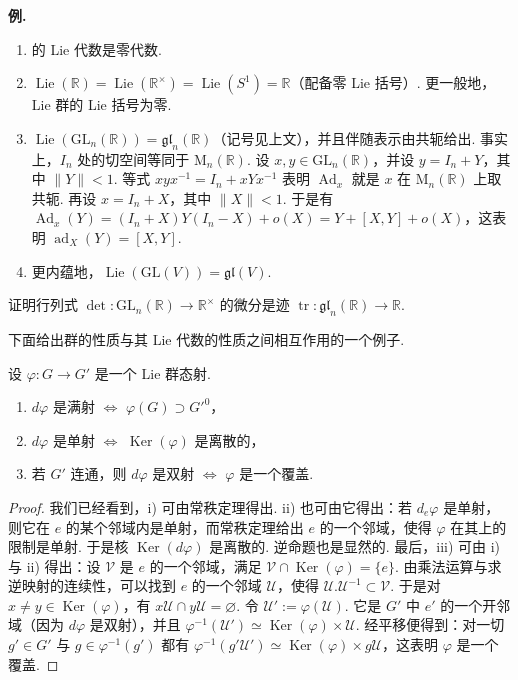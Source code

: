 \noindent\textbf{例.}
\begin{enumerate}[label=\roman*)]
\item {}的 Lie 代数是零代数.
\item $\operatorname{Lie}(\mathbb{R})=\operatorname{Lie}(\mathbb{R}^{\times})=\operatorname{Lie}(S^1)=\mathbb{R}$（配备零 Lie 括号）. 更一般地， Lie 群的 Lie 括号为零.
\item $\operatorname{Lie}(\mathrm{GL}_n(\mathbb{R}))=\mathfrak{gl}_n(\mathbb{R})$（记号见上文），并且伴随表示由共轭给出. 事实上，$I_n$ 处的切空间等同于 $\mathrm{M}_n(\mathbb{R})$. 设 $x,y\in\mathrm{GL}_n(\mathbb{R})$，并设 $y=I_n+Y$，其中 $\|Y\|<1$. 等式 $xyx^{-1}=I_n+xYx^{-1}$ 表明 $\operatorname{Ad}_x$ 就是 $x$ 在 $\mathrm{M}_n(\mathbb{R})$ 上取共轭. 再设 $x=I_n+X$，其中 $\|X\|<1$. 于是有 $\operatorname{Ad}_x(Y)=(I_n+X)Y(I_n-X)+o(X)=Y+[X,Y]+o(X)$，这表明 $\operatorname{ad}_X(Y)=[X,Y]$.
\item 更内蕴地，$\operatorname{Lie}(\mathrm{GL}(V))=\mathfrak{gl}(V)$.
\end{enumerate}

\begin{exercise*}
证明行列式 $\det:\mathrm{GL}_n(\mathbb{R})\longrightarrow\mathbb{R}^{\times}$ 的微分是迹 $\operatorname{tr}:\mathfrak{gl}_n(\mathbb{R})\longrightarrow\mathbb{R}$.
\end{exercise*}

下面给出群的性质与其 Lie 代数的性质之间相互作用的一个例子.

\begin{proposition}\label{prop:lie-1-5-8}
设 $\varphi:G\longrightarrow G'$ 是一个 Lie 群态射.
\begin{enumerate}[label=\roman*)]
\item $d\varphi$ 是满射 $\Leftrightarrow$ $\varphi(G)\supset G'^{0}$，
\item $d\varphi$ 是单射 $\Leftrightarrow$ $\operatorname{Ker}(\varphi)$ 是离散的，
\item 若 $G'$ 连通，则 $d\varphi$ 是双射 $\Leftrightarrow$ $\varphi$ 是一个覆盖.
\end{enumerate}
\end{proposition}

\begin{proof}
我们已经看到，i) 可由常秩定理得出. ii) 也可由它得出：若 $d_{e}\varphi$ 是单射，则它在 $e$ 的某个邻域内是单射，而常秩定理给出 $e$ 的一个邻域，使得 $\varphi$ 在其上的限制是单射. 于是核 $\operatorname{Ker}(d\varphi)$ 是离散的. 逆命题也是显然的. 最后，iii) 可由 i) 与 ii) 得出：设 $\mathcal{V}$ 是 $e$ 的一个邻域，满足 $\mathcal{V}\cap\operatorname{Ker}(\varphi)=\{e\}$. 由乘法运算与求逆映射的连续性，可以找到 $e$ 的一个邻域 $\mathcal{U}$，使得 $\mathcal{U}.\mathcal{U}^{-1}\subset\mathcal{V}$. 于是对 $x\neq y\in\operatorname{Ker}(\varphi)$，有 $x\mathcal{U}\cap y\mathcal{U}=\varnothing$. 令 $\mathcal{U}':=\varphi(\mathcal{U})$. 它是 $G'$ 中 $e'$ 的一个开邻域（因为 $d\varphi$ 是双射），并且 $\varphi^{-1}(\mathcal{U}')\simeq\operatorname{Ker}(\varphi)\times\mathcal{U}$. 经平移便得到：对一切 $g'\in G'$ 与 $g\in\varphi^{-1}(g')$ 都有 $\varphi^{-1}(g'\mathcal{U}')\simeq\operatorname{Ker}(\varphi)\times g\mathcal{U}$，这表明 $\varphi$ 是一个覆盖.
\end{proof}

